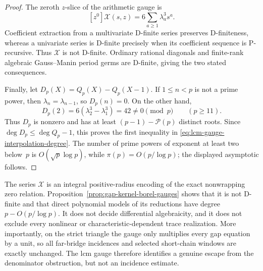 \begin{proof}
The zeroth $z$-slice of the arithmetic gauge is
\[
 [z^0]\mathcal X(s,z)=6\sum_{a\geq1}\lambda_a^3s^a.
\]
Coefficient extraction from a multivariate D-finite series preserves
D-finiteness, whereas a univariate series is D-finite precisely when its
coefficient sequence is P-recursive.  Thus $\mathcal X$ is not D-finite.
Ordinary rational diagonals and finite-rank algebraic Gauss--Manin period
germs are D-finite, giving the two stated consequences.

Finally, let $D_p(X)=Q_p(X)-Q_p(X-1)$.  If
$1\leq n<p$ is not a prime power, then
$\lambda_n=\lambda_{n-1}$, so $D_p(n)=0$.  On the other hand,
\[
 D_p(2)=6(\lambda_2^3-\lambda_1^3)=42\ne0\pmod p
 \qquad(p\geq11).
\]
Thus $D_p$ is nonzero and has at least
$(p-1)-\mathcal P(p)$ distinct roots.  Since
$\deg D_p\leq\deg Q_p-1$, this proves the first inequality in
\eqref{eq:lcm-gauge-interpolation-degree}.  The number of prime powers of
exponent at least two below~$p$ is $O(\sqrt p\log p)$, while
$\pi(p)=O(p/\log p)$; the displayed asymptotic follows.
\end{proof}

\begin{remark}
\label{rem:lcm-gap-gauge-scope}
The series $\mathcal X$ is an integral positive-radius encoding of the exact
nonwrapping zero relation.  Proposition~\ref{prop:gap-kernel-borel-gauges}
shows that it is not D-finite and that direct polynomial models of its
reductions have degree $p-O(p/\log p)$.  It does not decide differential
algebraicity, and it does not exclude every nonlinear or
characteristic-dependent trace realization.  More importantly, on the
strict triangle the gauge only multiplies every gap equation by a unit, so
all far-bridge incidences and selected short-chain windows are exactly
unchanged.  The lcm gauge therefore identifies a genuine escape from the
denominator obstruction, but not an incidence estimate.
\end{remark}
